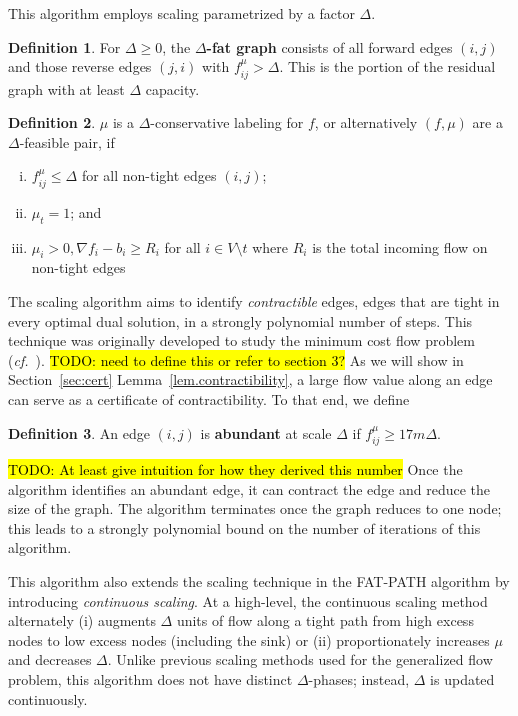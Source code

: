 \documentclass[11pt]{article}
\theoremstyle{definition}
\newtheorem{definition}{Definition}[section]
\theoremstyle{definition}
\newcommand{\nfi}{\nabla f_i}
\newcommand{\todo}[1]{\hl{TODO: #1}}
\begin{document}
	This algorithm employs scaling parametrized by a factor $\Delta$.
    \begin{definition}
	For $\Delta \geq 0$, the \textbf{$\Delta$-fat graph} consists of all
	forward edges $(i, j)$ and those reverse edges $(j, i)$ with $f_{ij}^\mu > \Delta$. This
    is the portion of the residual graph with at least $\Delta$ capacity.
    \end{definition}
    \begin{definition}
    $\mu$ is a $\Delta$-conservative labeling for $f$, or alternatively $(f, \mu)$ are a
	$\Delta$-feasible pair, if
        \begin{enumerate}[(i)]
        \item $f_{ij}^\mu \leq \Delta$ for all non-tight edges $(i, j)$;
        \item $\mu_t = 1$; and
        \item $\mu_i > 0, \nfi - b_i \geq R_i$ for all $i \in V \setminus t$ where $R_i$ is the total incoming flow on non-tight edges
        \end{enumerate}
   \end{definition}
    
	The scaling algorithm aims to identify \emph{contractible} edges,
	edges that are tight in every optimal dual solution,
    in a strongly polynomial number of steps. This technique was
    originally developed to study the minimum cost flow problem (\emph{cf.}~\cite{Orlin1988}). \todo{need to define this or refer to section 3?}
	As we will show in Section~\ref{sec:cert} Lemma~\ref{lem.contractibility}, a large flow value along an edge can
    serve as a certificate of contractibility. To that end, we define
    \begin{definition}
    An edge $(i, j)$ is \textbf{abundant} at scale $\Delta$ if $f_{ij}^\mu \geq 17m\Delta$.
    \end{definition}
		\todo{At least give intuition for how they derived this number}
	Once the algorithm identifies an abundant edge,
	it can contract the edge and reduce the size of the graph. The algorithm
	terminates once the graph reduces to one node; this leads to a
	strongly polynomial bound on the number of iterations of this algorithm.

This algorithm also extends the scaling technique in the FAT-PATH algorithm
    \cite{Goldberg:1991:CAG:105014.105022} by introducing \textit{continuous scaling}.  At a high-level, the continuous scaling
    method alternately (i) augments $\Delta$ units of flow along a tight path from high
    excess nodes to low excess nodes (including the sink) or (ii) proportionately increases $\mu$ and
    decreases $\Delta$. Unlike previous scaling methods used for the generalized flow problem,
    this algorithm does not have distinct $\Delta$-phases; instead, $\Delta$ is updated continuously.
    
\end{document}
